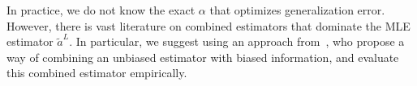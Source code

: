 In practice, we do not know the exact $\alpha$ that optimizes generalization error. However, there is vast literature on combined estimators that dominate the MLE estimator $\widetilde{a}^L$. In particular, we suggest using an approach from~\cite{GreenStrawderman2001}, who propose a way of combining an unbiased estimator with biased information, and evaluate this combined estimator empirically. %


